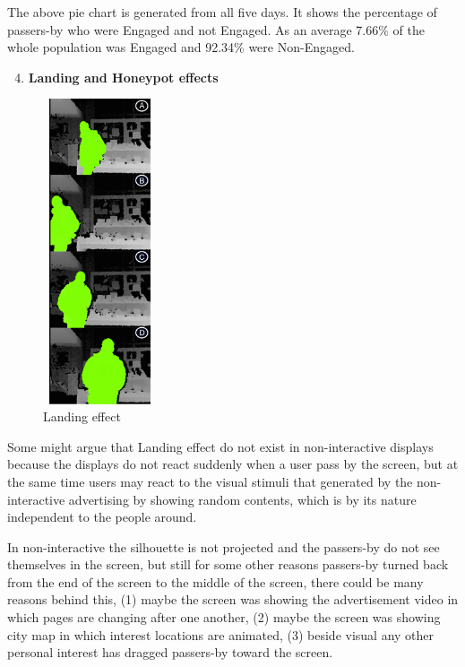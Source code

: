 \begin{enumerate}
The above pie chart is generated from all five days. It shows the percentage of passers-by who were Engaged and not Engaged. As an average 7.66\% of the whole population was Engaged and 92.34\% were Non-Engaged.


\end{enumerate}


\newpage
\begin{enumerate}
\setcounter{enumi}{3}
\item \textbf{Landing and Honeypot effects}
\end{enumerate}

\begin{figure}
  \vspace{-20pt}
  \begin{center}
    \includegraphics[width=0.30\textwidth,height=90mm]{figures/8/non_inter_findings/effects/landing}
  \end{center}
  \vspace{-20pt}
  \caption{Landing effect}
  \vspace{20pt}
\end{figure}
Some might argue that Landing\cite{EnticingPeople} effect do not exist in non-interactive displays because the displays do not react suddenly when a user pass by the screen, but at the same time users may react to the visual stimuli that generated by the non-interactive advertising by showing random contents, which is by its nature independent to the people around.

In non-interactive the silhouette is not projected and the passers-by do not see themselves in the screen, but still for some other reasons passers-by turned back from the end of the screen to the middle of the screen, there could be many reasons behind this, (1) maybe the screen was showing the advertisement video in which pages are changing after one another, (2) maybe the screen was showing city map in which interest locations are animated, (3) beside visual any other personal interest has dragged passers-by toward the screen. 

